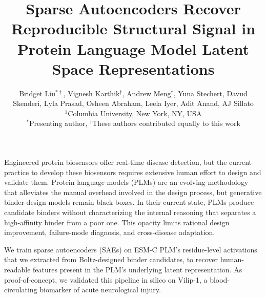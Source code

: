 \documentclass[11pt]{article}
\date{}
\title{Sparse Autoencoders Recover Reproducible Structural Signal in Protein Language Model Latent Space Representations}
\author{
    Bridget Liu$^{\ast\dagger}$,
    Vignesh Karthik$^{\dagger}$,
    Andrew Meng$^{\dagger}$,
    Yuna Stechert,
    Davud Skenderi,
    Lyla Prasad,
    Osheen Abraham,
    Leela Iyer,
    Adit Anand,
    AJ Sillato \\[6pt]
    {\small $^{1}$Columbia University, New York, NY, USA} \\
    {\small $^{\ast}$Presenting author, $^{\dagger}$These authors contributed equally to this work}
}
\newcommand{\onepagersection}[1]{\vspace{0.4\baselineskip}{\bfseries #1}\vspace{0.1\baselineskip}\par}
\begin{document}
\maketitle
\thispagestyle{empty}

\vspace{4pt}

\onepagersection{Motivation}
Engineered protein biosensors offer real-time disease detection, but the current practice to develop these biosensors requires extensive human effort to design and validate them. Protein language models (PLMs) are an evolving methodology that alleviates the manual overhead involved in the design process, but generative binder-design models remain black boxes. In their current state, PLMs produce candidate binders without characterizing the internal reasoning that separates a high-affinity binder from a poor one. This opacity limits rational design improvement, failure-mode diagnosis, and cross-disease adaptation.

\onepagersection{Approach}
We train sparse autoencoders (SAEs) on ESM-C PLM's residue-level activations that we extracted from Boltz-designed binder candidates, to recover human-readable features present in the PLM's underlying latent representation. As proof-of-concept, we validated this pipeline in silico on Vilip-1, a blood-circulating biomarker of acute neurological injury.
\end{document}
